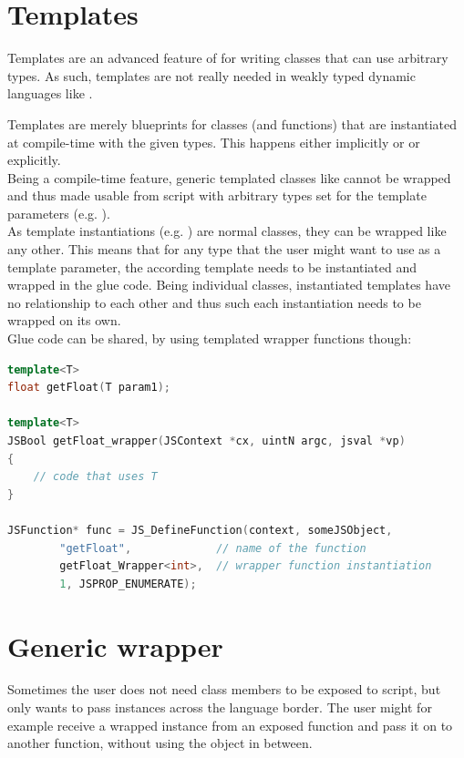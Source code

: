 \section{Templates}

Templates are an advanced feature of  for writing classes that can use arbitrary types. As such, templates are not really needed in weakly typed dynamic languages like .

Templates are merely blueprints for classes (and functions) that are instantiated at compile-time with the given types. This happens either implicitly or or explicitly.\\
Being a compile-time feature, generic templated classes like  cannot be wrapped and thus made usable from script with arbitrary types set for the template parameters (e.g. ).\\
As template instantiations (e.g. ) are normal classes, they can be wrapped like any other. This means that for any type that the  user might want to use as a template parameter, the according template needs to be instantiated and wrapped in the glue code. Being individual classes, instantiated templates have no relationship to each other and thus such each instantiation needs to be wrapped on its own.\\
Glue code can be shared, by using templated wrapper functions though: 

\SingleSpacing
\begin{lstlisting}[language=C++, caption=A templated JSNative]
template<T>
float getFloat(T param1);

template<T>
JSBool getFloat_wrapper(JSContext *cx, uintN argc, jsval *vp)
{
	// code that uses T
}

JSFunction* func = JS_DefineFunction(context, someJSObject,
        "getFloat",             // name of the function
        getFloat_Wrapper<int>,  // wrapper function instantiation
        1, JSPROP_ENUMERATE);
\end{lstlisting}
\OnehalfSpacing

\section{Generic wrapper}
\label{sec:GenericWrapper}
Sometimes the user does not need class members to be exposed to script, but only wants to pass instances across the language border. The user might for example receive a wrapped instance from an exposed  function and pass it on to another  function, without using the  object in between.

